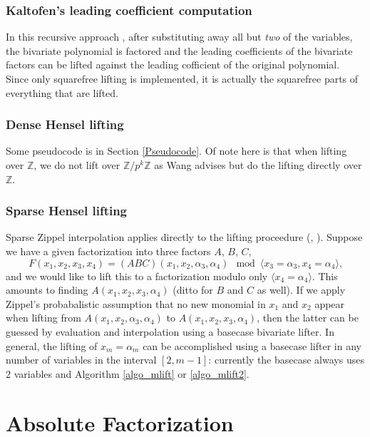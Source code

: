 \documentclass[11pt,reqno]{amsart}
\numberwithin{equation}{section}
\begin{document}
\subsubsection{Kaltofen's leading coefficient computation}
In this recursive approach \cite{KALTOFEN}, after substituting away all but 
\emph{two} of the variables, the bivariate polynomial is factored and the 
leading coefficients of the bivariate factors can be lifted against the leading 
cofficient of the original polynomial. Since only squarefree lifting is 
implemented, it is actually the squarefree parts of everything that are lifted.

\subsubsection{Dense Hensel lifting}
Some pseudocode is in Section \ref{Pseudocode}. Of note here is that when 
lifting over $\mathbb{Z}$, we do not lift over $\mathbb{Z}/p^k\mathbb{Z}$ as 
Wang \cite{WANG} advises but do the lifting directly over $\mathbb{Z}$.

\subsubsection{Sparse Hensel lifting}
Sparse Zippel interpolation applies directly to the lifting proceedure 
(\cite{SHLZIP}, \cite{SHL}). Suppose we have a given factorization into three 
factors $A$, $B$, $C$,
\begin{equation*}
F(x_1, x_2, x_3, x_4) = (A B C)(x_1, x_2, \alpha_3, \alpha_4) \mod \langle x_3 
=\alpha_3, x_4=\alpha_4 \rangle\text{,}
\end{equation*}
and we would like to lift this to a factorization modulo only $\langle 
x_4=\alpha_4 \rangle$. This amounts to finding $A(x_1, x_2, x_3, \alpha_4)$ 
(ditto for $B$ and $C$ as well). If we apply Zippel's probabalistic assumption 
that no new monomial in $x_1$ and $x_2$ appear when lifting from $A(x_1, x_2, 
\alpha_3, \alpha_4)$ to $A(x_1, x_2, x_3, \alpha_4)$, then the latter can be 
guessed by evaluation and interpolation using a basecase bivariate lifter. In 
general, the lifting of $x_m = \alpha_m$ can be accomplished using a basecase 
lifter in any number of variables in the interval $[2,m-1]$: currently the 
basecase always uses $2$ variables and Algorithm \ref{algo_mlift} or 
\ref{algo_mlift2}.

\section{Absolute Factorization}
\end{document}
